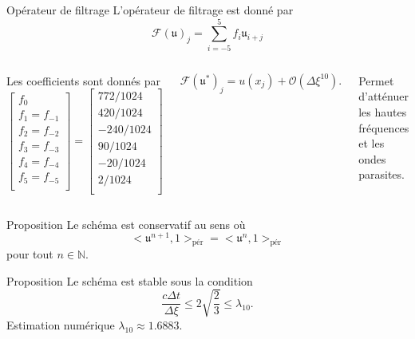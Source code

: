 \documentclass[11pt]{beamer}
\def\gsum{\displaystyle\sum\limits}
\begin{document}
\begin{frame}{Opérateur de filtrage}
L'opérateur de filtrage est donné par
$$
\mathcal{F} (\mathfrak{u})_j = \gsum_{i=-5}^5 f_i \mathfrak{u}_{i+j} 
$$
\begin{columns}
Les coefficients sont donnés par
$$
\begin{bmatrix}
f_0\\
f_1 = f_{-1}\\
f_2 = f_{-2}\\
f_3 = f_{-3}\\
f_4 = f_{-4}\\
f_5 = f_{-5}\\
\end{bmatrix} =
\begin{bmatrix}
772/1024\\
420/1024\\
-240/1024\\
90/1024\\
-20/1024\\
2/1024\\
\end{bmatrix}
$$


\begin{block}{}
$$
\mathcal{F}(\mathfrak{u}^*)_j = u(x_j) + \mathcal{O} \left( \Delta \xi^{10} \right).
$$
\end{block}

\begin{block}{}
Permet d'atténuer les hautes fréquences et les ondes parasites.
\end{block}
\end{columns}

\end{frame}





\begin{frame}{}
\begin{block}{Proposition}
Le schéma est conservatif au sens où
$$
<\mathfrak{u}^{n+1},\mathfrak{1}>_{\text{pér}} = <\mathfrak{u}^{n},\mathfrak{1}>_{\text{pér}}
$$
pour tout $n \in \mathbb{N}$.
\end{block}


\begin{block}{Proposition}
Le schéma est stable sous la condition
$$
\dfrac{c \Delta t}{\Delta \xi} \leq 2 \sqrt{\dfrac{2}{3}} \leq \lambda_{10}.
$$
Estimation numérique $\lambda_{10} \approx 1.6883$. 
\end{block}
\end{frame}
\end{document}
